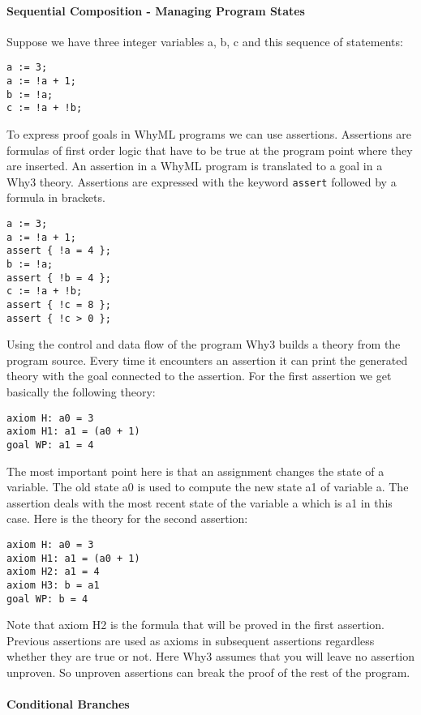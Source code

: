 \paragraph{Sequential Composition - Managing Program States}

Suppose we have three integer variables a, b, c and this sequence of
statements:
\begin{lstlisting}
a := 3;
a := !a + 1;
b := !a;
c := !a + !b;
\end{lstlisting}
To express proof goals in WhyML programs we can use assertions. 
Assertions are formulas of first order logic that have to be true at 
the program point where they are inserted. An assertion in a WhyML program
is translated to a goal in a Why3 theory. Assertions are expressed with the
keyword \verb"assert" followed by a formula in brackets.
\begin{lstlisting}
a := 3;
a := !a + 1;
assert { !a = 4 };
b := !a;
assert { !b = 4 };
c := !a + !b;
assert { !c = 8 };
assert { !c > 0 };
\end{lstlisting}
Using the control and data flow of the program Why3 builds a theory from
the program source. Every time it encounters an assertion it can print the
generated theory with the goal connected to the assertion. For the first
assertion we get basically the following theory:
\begin{lstlisting}
axiom H: a0 = 3
axiom H1: a1 = (a0 + 1)
goal WP: a1 = 4
\end{lstlisting}
The most important point here is that an assignment changes the state of
a variable. The old state a0 is used to compute the new state a1 of 
variable a. The assertion deals with the most recent state of the 
variable a which is a1 in this case.
Here is the theory for the second assertion:
\begin{lstlisting}
axiom H: a0 = 3
axiom H1: a1 = (a0 + 1)
axiom H2: a1 = 4
axiom H3: b = a1
goal WP: b = 4
\end{lstlisting}
Note that axiom H2 is the formula that will be proved in the first
assertion. Previous assertions are used as axioms in subsequent assertions
regardless whether they are true or not. Here Why3 assumes that you will
leave no assertion unproven. So unproven assertions can break the proof of
the rest of the program.

\paragraph{Conditional Branches}

